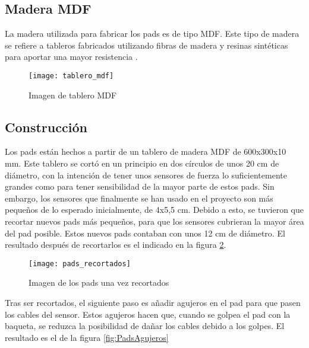         \subsection{Madera MDF} %
        \label{sub:MaderaMDF}

            La madera utilizada para fabricar los pads es de tipo MDF. Este tipo de madera se refiere a tableros
            fabricados utilizando fibras de madera y resinas sintéticas para aportar una mayor
            resistencia \cite{mdf_santana}.

            \begin{figure}[ht]
                \centering
                \texttt{[image: tablero\_mdf]}
                \caption{Imagen de tablero MDF\label{fig:TableroMDF}}
            \end{figure}


        \subsection{Construcción} %
        \label{sub:ConstruccionPads}

            Los pads están hechos a partir de un tablero de madera MDF de 600x300x10 mm. Este tablero se cortó en un
            principio en dos círculos de unos 20 cm de diámetro, con la intención de tener unos sensores de fuerza lo
            suficientemente grandes como para tener sensibilidad de la mayor parte de estos pads. Sin embargo, los
            sensores que finalmente se han usado en el proyecto son más pequeños de lo esperado inicialmente, de
            4x5,5 cm. Debido a esto, se tuvieron que recortar nuevos pads más pequeños, para que los sensores cubrieran
            la mayor área del pad posible. Estos nuevos pads contaban con unos 12 cm de diámetro. El resultado después
            de recortarlos es el indicado en la figura \ref{fig:PadsRecortados}.

            \begin{figure}[ht]
                \centering
                \texttt{[image: pads\_recortados]}
                \caption{Imagen de los pads una vez recortados\label{fig:PadsRecortados}}
            \end{figure}

            \newpage

            Tras ser recortados, el siguiente paso es añadir agujeros en el pad para que pasen los cables del sensor.
            Estos agujeros hacen que, cuando se golpea el pad con la baqueta, se reduzca la posibilidad de dañar los
            cables debido a los golpes. El resultado es el de la figura \ref{fig:PadsAgujeros}

